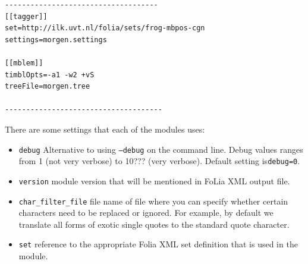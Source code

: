 \documentclass{book}
\begin{document}
\begin{verbatim}
------------------------------------
[[tagger]]
set=http://ilk.uvt.nl/folia/sets/frog-mbpos-cgn
settings=morgen.settings

[[mblem]]
timblOpts=-a1 -w2 +vS
treeFile=morgen.tree

-------------------------------------
\end{verbatim}

There are some settings that each of the modules uses:

\begin{itemize}
\item {\tt debug} Alternative to using {\tt --debug} on the command line. Debug values ranges from 1 (not very verbose) to 10??? (very verbose). Default setting is{\tt debug=0}. %

\item {\tt version} module version that will be mentioned in FoLia XML output file.

\item {\tt char\_filter\_file} file name of file where you can specify whether certain characters need to be replaced or ignored. For example, by default we translate all forms of exotic single quotes to the standard quote character.

\item {\tt set} reference to the appropriate Folia XML set definition that is used in the module.
\end{itemize}










\end{document}
